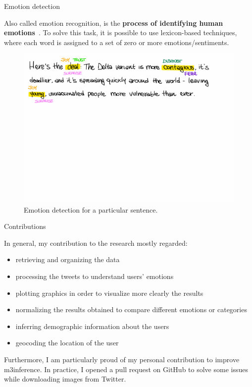 \documentclass[8pt]{beamer}  %
\begin{document}
\begin{frame}{Emotion detection}

    Also called emotion recognition, is the \textbf{process of identifying human emotions}~\autocite{enwiki:1023798177}. To solve this task, it is possible to use lexicon-based techniques, where each word is assigned to a set of zero or more emotions/sentiments.

    \begin{figure}[H]
    	\centering
    	\includegraphics[scale=.45,trim= 0 700 0 30, clip]{assets/img/emotion_detection_example.pdf}
    	\caption{Emotion detection for a particular sentence.}
    	\label{fig:emotion-detection-example}
    \end{figure}

\end{frame}

\begin{frame}{Contributions}

    In general, my contribution to the research mostly regarded:
    
    \begin{itemize}
    	\item retrieving and organizing the data
    	\item processing the tweets to understand users' emotions
    	\item plotting graphics in order to visualize more clearly the results
    	\item normalizing the results obtained to compare different emotions or categories
    	\item inferring demographic information about the users
    	\item geocoding the location of the user
    \end{itemize}
    
    Furthermore, I am particularly proud of my personal contribution to improve m3inference. In practice, I opened a pull request on GitHub to solve some issues while downloading images from Twitter.

\end{frame}
\end{document}
